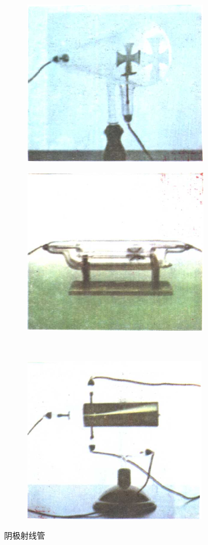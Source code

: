 \begin{figure}[htbp]
	\centering
	\begin{subfigure}{0.43\linewidth}
		\centering
		\includegraphics{fig/B/0-5a.png}
		\caption{}\label{fig_B_0-5a}
	\end{subfigure}
	\hfil
	\begin{subfigure}{0.43\linewidth}
		\centering
		\includegraphics{fig/B/0-5b.png}
		\caption{}\label{fig_B_0-5b}
	\end{subfigure}
	\\
	\begin{subfigure}{0.43\linewidth}
		\centering
		\includegraphics{fig/B/0-5c.png}
		\caption{}\label{fig_B_0-5c}
	\end{subfigure}
	\caption{阴极射线管}\label{fig_B_0-5}
\end{figure}



